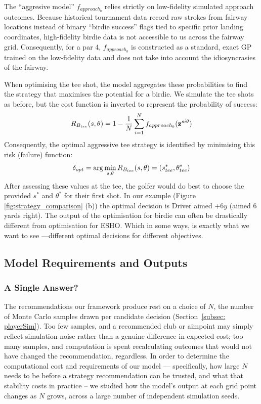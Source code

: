 \documentclass[11pt, letterpaper]{article}
\begin{document}
The ``aggresive model'' $f_{approach_b}$ relies strictly on low-fidelity simulated approach outcomes. Because historical tournament data record raw strokes from fairway locations instead of binary ``birdie success'' flags tied to specific prior landing coordinates, high-fidelity birdie data is not accessible to us across the fairway grid. Consequently, for a par 4, $f_{approach_b}$ is constructed as a standard, exact GP trained on the low-fidelity data and does not take into account the idiosyncrasies of the fairway.

When optimising the tee shot, the model aggregates these probabilities to find the strategy that maximises the potential for a birdie. We simulate the tee shots as before, but the cost function is inverted to represent the probability of success:
$$R_{B_{tee}}(s, \theta) = 1 - \frac{1}{N} \sum^N_{i =1} f_{approach_b}(\mathbf{z}^{si\theta})$$
Consequently, the optimal aggressive tee strategy is identified by minimising this risk (failure) function: 
\[\delta_{opt} =\arg\min_{s,\theta} R_{B_{tee}}(s, \theta) = (s^*_{tee}, \theta^*_{tee})\]
After assessing these values at the tee, the golfer would do best to choose the provided $s^*$ and $\theta^*$ for their first shot. \change In our example (Figure \ref{fig:strategy_comparison} (b)) the optimal decision is Driver aimed $+6y$ (aimed $6$ yards right).
The output of the optimisation for birdie can often be drastically different from optimisation for ESHO. Which in some ways, is exactly what we want to see ---different optimal decisions for different objectives. 


\subsection{Model Requirements and Outputs}

\subsubsection{A Single Answer?}
\label{subsec:Convergence}

The recommendations our framework produce rest on a choice of $N$, the number of Monte
Carlo samples drawn per candidate decision (Section~\ref{subsec: playerSim}). Too few samples, and a recommended club or aimpoint may simply reflect simulation noise rather than a genuine difference in expected cost; too many samples, and computation is spent recalculating outcomes that would not have changed the recommendation, regardless. In order to determine the computational cost and requirements of our model --- specifically, how large $N$ needs to be before a strategy recommendation can be trusted, and what that stability costs in practice -- we studied how the
model's output at each grid point changes as $N$ grows, across a large number of independent
simulation seeds.
\end{document}
